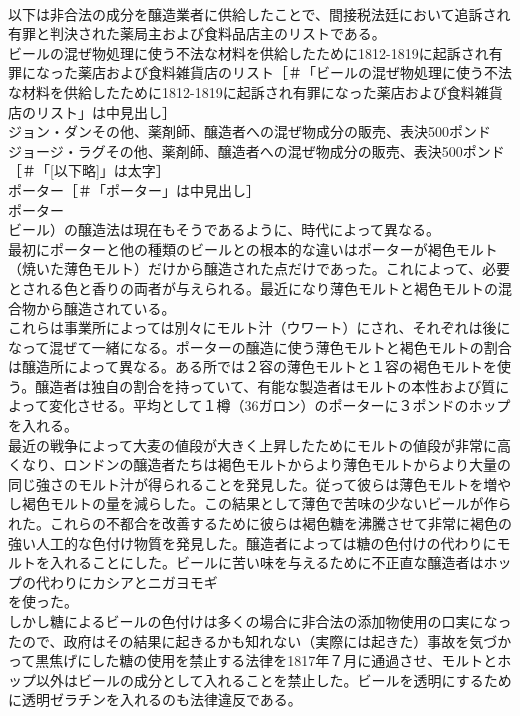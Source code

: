 \documentclass[8pt]{extreport}
\begin{document}
\begin{CJK}{UTF8}{min}
\\	以下は非合法の成分を醸造業者に供給したことで、間接税法廷において追訴され有罪と判決された薬局主および食料品店主のリストである。
\\	ビールの混ぜ物処理に使う不法な材料を供給したために1812-1819に起訴され有罪になった薬店および食料雑貨店のリスト［＃「ビールの混ぜ物処理に使う不法な材料を供給したために1812-1819に起訴され有罪になった薬店および食料雑貨店のリスト」は中見出し］
\\	ジョン・ダンその他、薬剤師、醸造者への混ぜ物成分の販売、表決500ポンド
\\	ジョージ・ラグその他、薬剤師、醸造者への混ぜ物成分の販売、表決500ポンド
\\	[以下略]［＃「[以下略]」は太字］
\\	ポーター［＃「ポーター」は中見出し］
\\	ポーター
\\	ビール）の醸造法は現在もそうであるように、時代によって異なる。
\\	最初にポーターと他の種類のビールとの根本的な違いはポーターが褐色モルト（焼いた薄色モルト）だけから醸造された点だけであった。これによって、必要とされる色と香りの両者が与えられる。最近になり薄色モルトと褐色モルトの混合物から醸造されている。
\\	これらは事業所によっては別々にモルト汁（ウワート）にされ、それぞれは後になって混ぜて一緒になる。ポーターの醸造に使う薄色モルトと褐色モルトの割合は醸造所によって異なる。ある所では２容の薄色モルトと１容の褐色モルトを使う。醸造者は独自の割合を持っていて、有能な製造者はモルトの本性および質によって変化させる。平均として１樽（36ガロン）のポーターに３ポンドのホップを入れる。
\\	最近の戦争によって大麦の値段が大きく上昇したためにモルトの値段が非常に高くなり、ロンドンの醸造者たちは褐色モルトからより薄色モルトからより大量の同じ強さのモルト汁が得られることを発見した。従って彼らは薄色モルトを増やし褐色モルトの量を減らした。この結果として薄色で苦味の少ないビールが作られた。これらの不都合を改善するために彼らは褐色糖を沸騰させて非常に褐色の強い人工的な色付け物質を発見した。醸造者によっては糖の色付けの代わりにモルトを入れることにした。ビールに苦い味を与えるために不正直な醸造者はホップの代わりにカシアとニガヨモギ
\\	を使った。
\\	しかし糖によるビールの色付けは多くの場合に非合法の添加物使用の口実になったので、政府はその結果に起きるかも知れない（実際には起きた）事故を気づかって黒焦げにした糖の使用を禁止する法律を1817年７月に通過させ、モルトとホップ以外はビールの成分として入れることを禁止した。ビールを透明にするために透明ゼラチンを入れるのも法律違反である。

\end{CJK}
\end{document}
